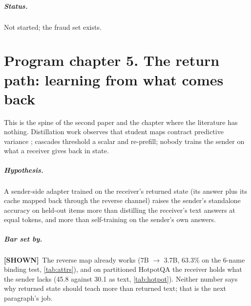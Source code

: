 \documentclass[11pt,a4paper]{report}
\newcommand{\SHOWN}{\textcolor{shownc}{\textbf{\scriptsize[SHOWN]}}}
\newcommand{\BET}{\textcolor{betc}{\textbf{\scriptsize[BET]}}}
\newcommand{\mbet}{\marginnote{\BET}}
\begin{document}
\paragraph{Status.} Not started; the fraud set exists.

\chapter{Program chapter 5. The return path: learning from what comes back}
\label{ch:p-return}

This is the spine of the second paper and the chapter where the literature has nothing. Distillation work observes that student maps contract predictive variance \citep{2601.18909}; cascades threshold a scalar and re-prefill; nobody trains the sender on what a receiver gives back in state.

\paragraph{Hypothesis.} \mbet A sender-side adapter trained on the receiver's returned state (its answer plus its cache mapped back through the reverse channel) raises the sender's standalone accuracy on held-out items more than distilling the receiver's text answers at equal tokens, and more than self-training on the sender's own answers.

\paragraph{Bar set by.} \SHOWN\ The reverse map already works (7B $\to$ 3.7B, 63.3\% on the 6-name binding test, \cref{tab:attrs}), and on partitioned HotpotQA the receiver holds what the sender lacks (45.8 against 30.1 as text, \cref{tab:hotpot}). Neither number says why returned state should teach more than returned text; that is the next paragraph's job.
\end{document}
